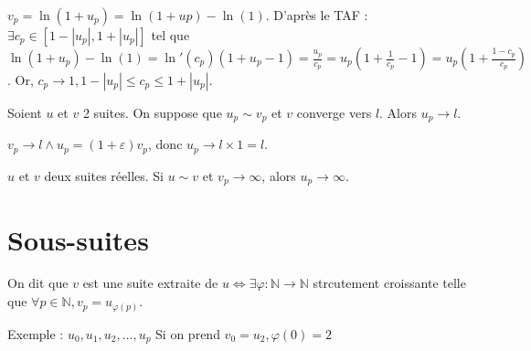 \documentclass[french]{yLectureNote}
\newcommand{\N}[0]{\mathbb{N}}
\begin{document}
$v_p = \ln(1+u_p) = \ln(1+up) - \ln(1)$. D'après le TAF :$\exists c_p\in[1-|u_p|,1+|u_p|]$ tel que $\ln(1+u_p) - \ln(1) = \ln'(c_p)(1+u_p-1) = \frac{u_p}{c_p} = u_p(1+\frac{1}{c_p} -1) = u_p(1+\frac{1-c_p}{c_p})$. Or, $c_p \to 1, 1-|u_p| \leq c_p\leq 1+|u_p|$.
\begin{proposition}
Soient $u$ et $v$ 2 suites. On suppose que $u_p\sim v_p$ et $v$ converge vers $l$. Alors $u_p\to l$.
\end{proposition}
\begin{myproof}[À faire]
$v_p \to l \wedge u_p = (1+\varepsilon)v_p$, donc $u_p \to l \times 1 = l$.
\end{myproof}
\begin{proposition}
$u$ et $v$ deux suites réelles. Si $u\sim v$ et $v_p\to\infty$, alors $u_p\to \infty$.
\end{proposition}
\section{Sous-suites}
\begin{definition}
On dit que $v$ est une suite extraite de $u \iff \exists \varphi : \N \to \N$ strcutement croissante telle que $\forall p\in\N, v_p = u_{\varphi(p)}$.

\end{definition}

Exemple : $u_0,u_1,u_2,\dots,u_p$ Si on prend $v_0 = u_2, \varphi(0) = 2$
\end{document}
